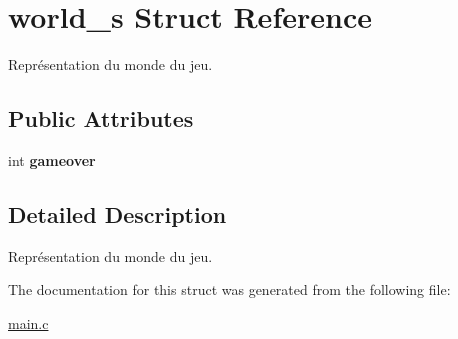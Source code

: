 \hypertarget{structworld__s}{\section{world\-\_\-s Struct Reference}
\label{structworld__s}
}


Représentation du monde du jeu.  


\subsection*{Public Attributes}
\begin{DoxyCompactItemize}
\item 
\hypertarget{structworld__s_a693aa82d082fe3467969094559b9bc0f}{int {\bfseries gameover}}\label{structworld__s_a693aa82d082fe3467969094559b9bc0f}

\end{DoxyCompactItemize}


\subsection{Detailed Description}
Représentation du monde du jeu. 

The documentation for this struct was generated from the following file\-:\begin{DoxyCompactItemize}
\item 
\hyperlink{main_8c}{main.\-c}\end{DoxyCompactItemize}
